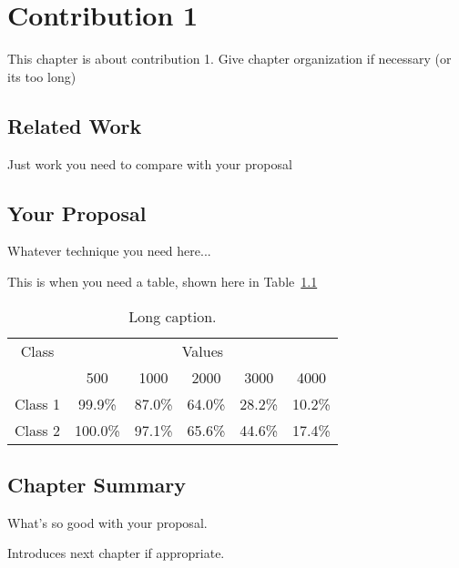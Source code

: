 \chapter{Contribution 1}\label{c3}%
This chapter is about contribution 1. Give chapter organization if
necessary (or its too long)

\section{Related Work}\label{c3:s1}
Just work you need to compare with your proposal

\section{Your Proposal}\label{c3:s2}
Whatever technique you need here...

This is when you need a table, shown here in Table~\ref{c3:t1}
%
\begin{table}[!ht]
  \centering
  \caption[Short caption]{Long caption.}
  \label{c3:t1}
  \begin{tabular}{|c|c|c|c|c|c|}
    \hline
    Class & \multicolumn{5}{|c|}{Values} \\
    \cline{2-6}
    & 500 & 1000 & 2000 & 3000 & 4000 \\
    \hline
    Class 1 & 99.9\% & 87.0\% & 64.0\% & 28.2\% & 10.2\% \\
    Class 2 & 100.0\% & 97.1\% & 65.6\% & 44.6\% & 17.4\% \\
    \hline
  \end{tabular}
\end{table}

\section{Chapter Summary}\label{c3:s3}%
What's so good with your proposal.

Introduces next chapter if appropriate.

